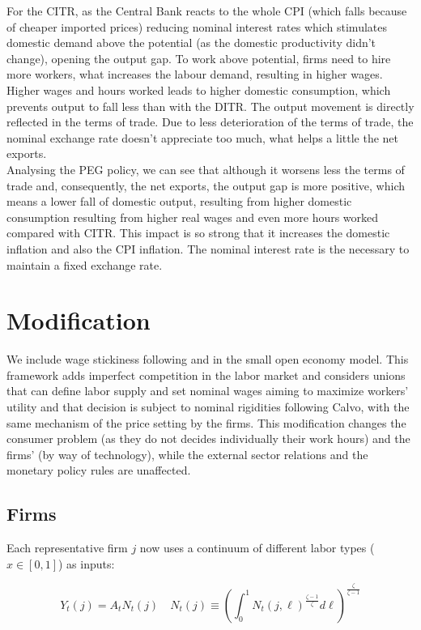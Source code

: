\documentclass{article}
\begin{document}
For the CITR, as the Central Bank reacts to the whole CPI (which falls because of cheaper imported prices) reducing nominal interest rates which stimulates domestic demand above the potential (as the domestic productivity didn't change), opening the output gap. To work above potential, firms need to hire more workers, what increases the labour demand, resulting in higher wages. Higher wages and hours worked leads to higher domestic consumption, which prevents output to fall less than with the DITR. The output movement is directly reflected in the terms of trade. Due to less deterioration of the terms of trade, the nominal exchange rate doesn't appreciate too much, what helps a little the net exports.\\

Analysing the PEG policy, we can see that although it worsens less the terms of trade and, consequently, the net exports, the output gap is more positive, which means a lower fall of domestic output, resulting from higher domestic consumption resulting from higher real wages and even more hours worked compared with CITR. This impact is so strong that it increases the domestic inflation and also the CPI inflation. The nominal interest rate is the necessary to maintain a fixed exchange rate.

\section{Modification}
We include wage stickiness following \cite{erceg} and \citet[Chap.~6]{gali2015} in the small open economy model. This framework adds imperfect competition in the labor market and considers unions that can define labor supply and set nominal wages aiming to maximize workers' utility and that decision is subject to nominal rigidities following Calvo, with the same mechanism of the price setting by the firms. This modification changes the consumer problem (as they do not decides individually their work hours) and the firms' (by way of technology), while the external sector relations and the monetary policy rules are unaffected.

\subsection{Firms}
Each representative firm $j$ now uses a continuum of different labor types ($x \in [0,1]$) as inputs:

\begin{equation}
    Y_t(j) = A_t N_t(j) \quad N_t(j) \equiv \left( \int^1_0 N_t(j, \ell)^{\frac{\zeta-1}{\zeta}} d\ell \right)^{\frac{\zeta}{\zeta-1}}
\end{equation}
\end{document}
